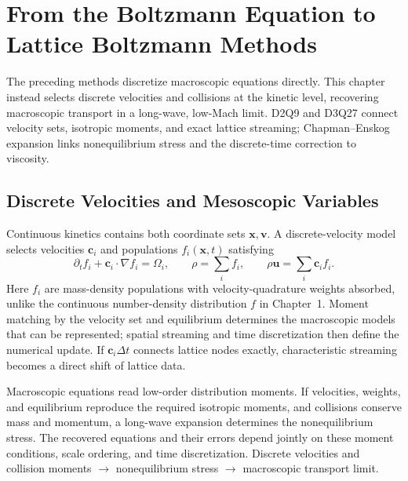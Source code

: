 \chapter{From the Boltzmann Equation to Lattice Boltzmann Methods}\label{ch:15}
\begin{chaptersummary}
The preceding methods discretize macroscopic equations directly. This chapter instead selects discrete velocities and collisions at the kinetic level, recovering macroscopic transport in a long-wave, low-Mach limit. D2Q9 and D3Q27 connect velocity sets, isotropic moments, and exact lattice streaming; Chapman--Enskog expansion links nonequilibrium stress and the discrete-time correction to viscosity.
\end{chaptersummary}

\section{Discrete Velocities and Mesoscopic Variables}
Continuous kinetics contains both coordinate sets $\bm x,\bm v$.
A discrete-velocity model selects velocities $\bm c_i$ and populations $f_i(\bm x,t)$ satisfying
\[
\partial_tf_i+\bm c_i\cdot\nabla f_i=\Omega_i,\qquad
\rho=\sum_i f_i,\qquad \rho\bm u=\sum_i\bm c_i f_i.
\]
Here $f_i$ are mass-density populations with velocity-quadrature weights absorbed,
unlike the continuous number-density distribution $f$ in Chapter~1.
Moment matching by the velocity set and equilibrium determines the macroscopic models that can be represented;
spatial streaming and time discretization then define the numerical update.
If $\bm c_i\Delta t$ connects lattice nodes exactly, characteristic streaming becomes a direct shift of lattice data.

{Macroscopic equations read low-order distribution moments. If velocities, weights, and equilibrium reproduce the required isotropic moments,
and collisions conserve mass and momentum, a long-wave expansion determines the nonequilibrium stress.
The recovered equations and their errors depend jointly on these moment conditions, scale ordering, and time discretization.}
{Discrete velocities and collision moments $\longrightarrow$ nonequilibrium stress $\longrightarrow$ macroscopic transport limit.}

